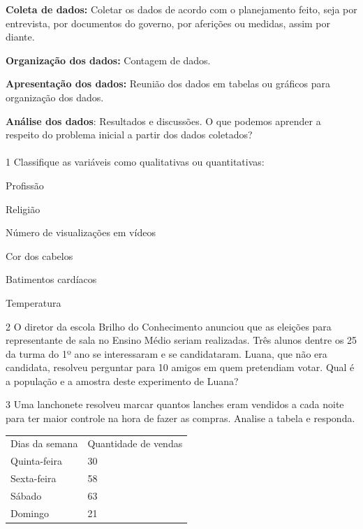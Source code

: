 \textbf{Coleta de dados:} Coletar os dados de acordo com o planejamento
feito, seja por entrevista, por documentos do governo, por aferições ou
medidas, assim por diante.

\textbf{Organização dos dados:} Contagem de dados.

\textbf{Apresentação dos dados:} Reunião dos dados em tabelas ou
gráficos para organização dos dados.

\textbf{Análise dos dados}: Resultados e discussões. O que podemos
aprender a respeito do problema inicial a partir dos dados coletados? \\ \\

\num{1} Classifique as variáveis como qualitativas ou quantitativas:

\begin{escolha}

\item Profissão \ 

\item Religião \ 

\item Número de visualizações em vídeos \ 

\item Cor dos cabelos \ 

\item Batimentos cardíacos \ 

\item Temperatura \ 

\end{escolha}

\num{2} O diretor da escola Brilho do Conhecimento anunciou que as eleições
para representante de sala no Ensino Médio seriam realizadas. Três
alunos dentre os 25 da turma do 1º ano se interessaram e se
candidataram. Luana, que não era candidata, resolveu perguntar para 10
amigos em quem pretendiam votar. Qual é a população e a amostra deste
experimento de Luana?


\num{3} Uma lanchonete resolveu marcar quantos lanches eram vendidos a cada
noite para ter maior controle na hora de fazer as compras. Analise a
tabela e responda.

\begin{longtable}[]{@{}ll@{}}
\toprule
\endhead
Dias da semana & Quantidade de vendas\tabularnewline
Quinta-feira~ & 30\tabularnewline
Sexta-feira & 58\tabularnewline
Sábado & 63\tabularnewline
Domingo & 21\tabularnewline
\bottomrule
\end{longtable}

